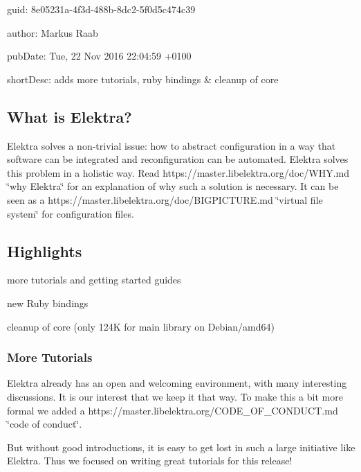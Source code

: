 
\begin{DoxyItemize}
\item guid\+: 8e05231a-\/4f3d-\/488b-\/8dc2-\/5f0d5c474c39
\item author\+: Markus Raab
\item pub\+Date\+: Tue, 22 Nov 2016 22\+:04\+:59 +0100
\item short\+Desc\+: adds more tutorials, ruby bindings \& cleanup of core
\end{DoxyItemize}

\subsection*{What is Elektra?}

Elektra solves a non-\/trivial issue\+: how to abstract configuration in a way that software can be integrated and reconfiguration can be automated. Elektra solves this problem in a holistic way. Read https\+://master.libelektra.\+org/doc/\+W\+HY.md \char`\"{}why Elektra\char`\"{} for an explanation of why such a solution is necessary. It can be seen as a https\+://master.libelektra.\+org/doc/\+B\+I\+G\+P\+I\+C\+T\+U\+RE.md \char`\"{}virtual file system\char`\"{} for configuration files.

\subsection*{Highlights}


\begin{DoxyItemize}
\item more tutorials and getting started guides
\item new Ruby bindings
\item cleanup of core (only 124K for main library on Debian/amd64)
\end{DoxyItemize}

\subsubsection*{More Tutorials}

Elektra already has an open and welcoming environment, with many interesting discussions. It is our interest that we keep it that way. To make this a bit more formal we added a https\+://master.libelektra.\+org/\+C\+O\+D\+E\+\_\+\+O\+F\+\_\+\+C\+O\+N\+D\+U\+CT.md \char`\"{}code of
conduct\char`\"{}.

But without good introductions, it is easy to get lost in such a large initiative like Elektra. Thus we focused on writing great tutorials for this release!


